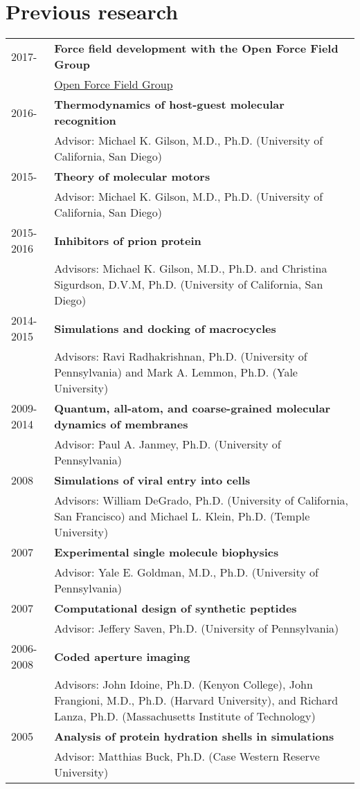 \documentclass[letterpaper,11pt]{article}
\begin{document}
\nopagebreak[4]
\section{Previous research}
\begin{longtable}[H]{lp{16cm}}
2017- & \bf{Force field development with the Open Force Field Group} \\
      & \href{http://www.openforcefield.org}{Open Force Field Group} \\
2016- & \bf{Thermodynamics of host-guest molecular recognition} \\
      & Advisor: Michael K. Gilson, M.D., Ph.D. (University of California, San Diego)\\
2015- & \bf{Theory of molecular motors} \\
      & Advisor: Michael K. Gilson, M.D., Ph.D. (University of California, San Diego)\\
2015-2016 & \bf{Inhibitors of prion protein} \\
      & Advisors: Michael K. Gilson, M.D., Ph.D. and Christina Sigurdson, D.V.M, Ph.D. (University of California, San Diego)\\
2014-2015 & \bf{Simulations and docking of macrocycles} \\
     & Advisors: Ravi Radhakrishnan, Ph.D. (University of Pennsylvania) and Mark A. Lemmon, Ph.D. (Yale University) \\
2009-2014 & \bf{Quantum, all-atom, and coarse-grained molecular dynamics of membranes} \\
     & Advisor: Paul A. Janmey, Ph.D. (University of Pennsylvania) \\
2008 & \bf{Simulations of viral entry into cells} \\
     & Advisors: William DeGrado, Ph.D. (University of California, San Francisco) and Michael L. Klein, Ph.D. (Temple University) \\
2007 & \bf{Experimental single molecule biophysics} \\
     & Advisor: Yale E. Goldman, M.D., Ph.D. (University of Pennsylvania) \\
2007 & \bf{Computational design of synthetic peptides} \\
     & Advisor: Jeffery Saven, Ph.D. (University of Pennsylvania) \\
2006-2008 & \bf{Coded aperture imaging} \\
     & Advisors: John Idoine, Ph.D. (Kenyon College), John Frangioni, M.D., Ph.D. (Harvard University), and Richard Lanza, Ph.D. (Massachusetts Institute of Technology) \\
2005 & \bf{Analysis of protein hydration shells in simulations} \\
     & Advisor: Matthias Buck, Ph.D. (Case Western Reserve University) \\
\end{longtable}
\end{document}
